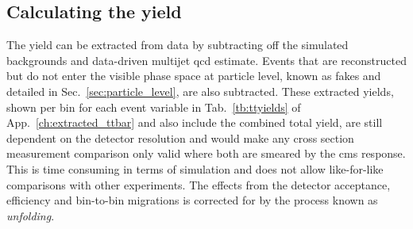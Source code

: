 \subsection{Calculating the \ttbar{} yield} %
\label{sub:calculating_the_yield}

The \ttbar{} yield can be extracted from data by subtracting off the simulated backgrounds and data-driven multijet \acrshort{qcd} estimate.
Events that are reconstructed but do not enter the visible phase space at particle level, known as fakes and detailed in Sec.~\ref{sec:particle_level}, are also subtracted.
These extracted \ttbar{} yields, shown per bin for each event variable in Tab.~\ref{tb:ttyields} of App.~\ref{ch:extracted_ttbar} and also include the combined total yield, are still dependent on the detector resolution and would make any cross section measurement comparison only valid where both are smeared by the \acrshort{cms} response.
This is time consuming in terms of simulation and does not allow like-for-like comparisons with other experiments.
The effects from the detector acceptance, efficiency and bin-to-bin migrations is corrected for by the process known as \textit{unfolding}.




